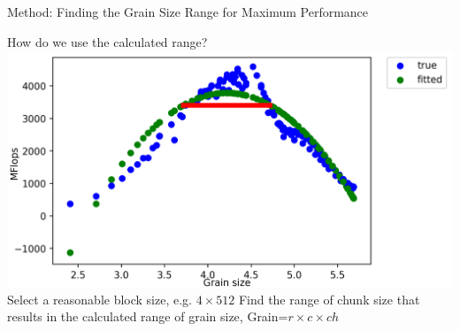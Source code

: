 \documentclass[10pt]{beamer}
\begin{document}

\begin{frame}{Method: Finding the Grain Size Range for Maximum Performance}
	\begin{outline}
	How do we use the calculated range?
	\includegraphics[scale=.3]{images/polyfit/fig_690_total_8_range.png}
	\1Select a reasonable block size, e.g. $4\times512$
	\1Find the range of chunk size that results in the calculated range of grain size, Grain=$r\times{c}\times{ch}$
	\end{outline}
\end{frame}
\end{document}
